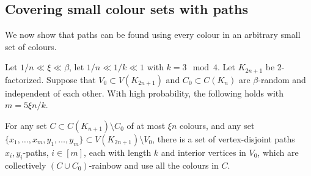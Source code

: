 \subsection{Covering small colour sets with paths}
We now show that paths can be found using every colour in an arbitrary small set of colours.
\begin{lemma}\label{colourcoverB} Let $1/n\ll \xi \ll\beta$, let $1/n\ll 1/k\ll 1$ with $k= 3 \mod 4$.
Let $K_{2n+1}$ be 2-factorized. Suppose that $V_0\subset V(K_{2n+1})$ and $C_0\subset C(K_n)$ are $\beta$-random and independent of each other. With high probability, the following holds with $m=5\xi n/k$.

For any set $C\subset C(K_{n+1})\setminus C_0$ of at most $\xi n$ colours, and any set $\{x_1,\ldots,x_m,y_1,\ldots,y_m\}\subset V(K_{2n+1})\setminus V_0$, there is a set of vertex-disjoint paths $x_i,y_i$-paths, $i\in [m]$, each with length $k$ and interior vertices in $V_0$, which are collectively $(C\cup C_0)$-rainbow and use all the colours in $C$.
\end{lemma}

